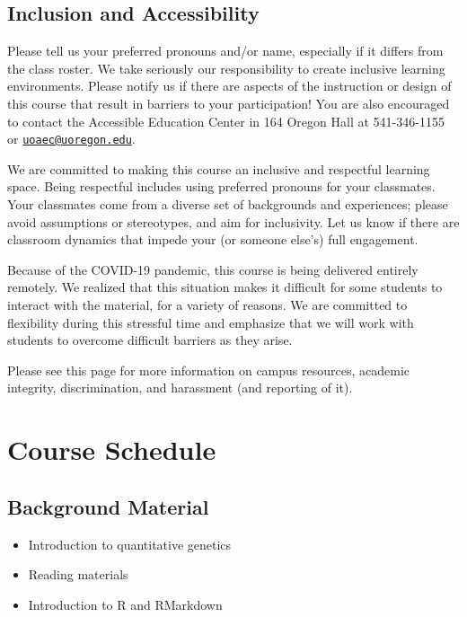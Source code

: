 \documentclass[
]{book}
\providecommand{\tightlist}{%
  \setlength{\itemsep}{0pt}\setlength{\parskip}{0pt}}
\begin{document}
\hypertarget{inclusion-and-accessibility}{%
\section{Inclusion and Accessibility}\label{inclusion-and-accessibility}}

Please tell us your preferred pronouns and/or name, especially if it differs from the class roster. We take seriously our responsibility to create inclusive learning environments. Please notify us if there are aspects of the instruction or design of this course that result in barriers to your participation! You are also encouraged to contact the Accessible Education Center in 164 Oregon Hall at 541-346-1155 or \href{mailto:uoaec@uoregon.edu}{\nolinkurl{uoaec@uoregon.edu}}.

We are committed to making this course an inclusive and respectful learning space. Being respectful includes using preferred pronouns for your classmates. Your classmates come from a diverse set of backgrounds and experiences; please avoid assumptions or stereotypes, and aim for inclusivity. Let us know if there are classroom dynamics that impede your (or someone else's) full engagement.

Because of the COVID-19 pandemic, this course is being delivered entirely remotely. We realized that this situation makes it difficult for some students to interact with the material, for a variety of reasons. We are committed to flexibility during this stressful time and emphasize that we will work with students to overcome difficult barriers as they arise.

Please see this page for more information on campus resources, academic integrity, discrimination, and harassment (and reporting of it).

\hypertarget{course-schedule}{%
\chapter{Course Schedule}\label{course-schedule}}

\hypertarget{background-material}{%
\section{Background Material}\label{background-material}}

\begin{itemize}
\tightlist
\item
  Introduction to quantitative genetics
\item
  Reading materials
\item
  Introduction to R and RMarkdown
\end{itemize}
\end{document}

